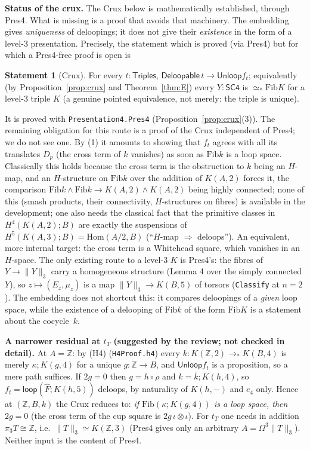 \documentclass[11pt]{amsart}
\theoremstyle{definition}
\newtheorem{statement}[theorem]{Statement}
\theoremstyle{remark}
\newcommand{\Om}{\Omega}
\newcommand{\code}[1]{\texttt{#1}}
\newcommand{\Fib}{\mathrm{Fib}}
\newcommand{\tr}[1]{\|#1\|}
\newcommand{\SCf}{\mathsf{SC4}}
\newcommand{\Tri}{\mathsf{Triples}}
\newcommand{\Del}{\mathsf{Deloopable}}
\newcommand{\Unloop}{\mathsf{Unloop}}
\newcommand{\pteq}{\simeq_*}
\newcommand{\lp}{\mathsf{loop}}
\newcommand{\Z}{\mathbb{Z}}
\begin{document}
\noindent\textbf{Status of the crux.} The Crux below is mathematically
established, through Pres4. What is missing is a proof that avoids that
machinery. The embedding gives \emph{uniqueness} of
deloopings; it does not give their \emph{existence} in the form of a level-$3$
presentation. Precisely, the statement which is proved (via Pres4) but for which a
Pres4-free proof is open is
\begin{statement}[Crux]
For every $t:\Tri$, $\Del\,t\to\Unloop f_t$; equivalently (by
Proposition~\ref{prop:crux} and Theorem~\ref{thm:E}) every $Y:\SCf$ is
$\pteq\Fib K$ for a level-$3$ triple $K$ (a genuine pointed equivalence, not
merely: the triple is unique).
\end{statement}
\noindent It is proved with \code{Presentation4.Pres4} (Proposition~\ref{prop:crux}(3)).
The remaining obligation for this route is a proof of the Crux independent of
Pres4; we do not see one. By (1) it amounts to
showing that $f_t$ agrees with all its translates $D_p$ (the cross term of $k$
vanishes) as soon as $\Fib k$ is a loop space. Classically this holds because
the cross term is the obstruction to $k$ being an $H$-map, and an $H$-structure
on $\Fib k$ over the addition of $K(A,2)$ forces it, the comparison
$\Fib k\wedge\Fib k\to K(A,2)\wedge K(A,2)$ being highly connected; none of this
(smash products, their connectivity, $H$-structures on fibres) is available in
the development; one also needs the classical fact that the primitive
classes in $H^4(K(A,2);B)$ are exactly the suspensions of
$H^5(K(A,3);B)=\mathrm{Hom}(A/2,B)$ (``$H$-map $\Rightarrow$ deloops''). An
equivalent, more internal target: the cross term is a Whitehead square, which
vanishes in an $H$-space. The only existing route to a level-$3$ $K$ is Pres4's: the
fibres of $Y\to\tr{Y}_3$ carry a homogeneous structure (Lemma 4 over the simply
connected $Y$), so $z\mapsto(E_z,\mu_z)$ is a map $\tr Y_3\to K(B,5)$ of
torsors (\code{Classify} at $n=2$). The embedding does not shortcut this: it
compares deloopings of a \emph{given} loop space, while the existence of a
delooping of $\Fib k$ of the form $\Fib K$ is a statement about the cocycle~$k$.

\noindent\textbf{A narrower residual at $t_T$ (suggested by the review; not
checked in detail).} At $A=\Z$: by (H4) (\code{H4Proof.h4}) every
$k:K(\Z,2)\to_*K(B,4)$ is merely $\kappa;K(g,4)$ for a unique $g:\Z\to B$, and
$\Unloop f_t$ is a proposition, so a mere path suffices. If $2g=0$ then
$g=h\circ\rho$ and $k=\bar k;K(h,4)$, so $f_t=\lp(\hat F;K(h,5))$ deloops, by
naturality of $K(h,-)$ and $e_4$ only. Hence at $(\Z,B,k)$ the Crux reduces
to: \emph{if $\Fib(\kappa;K(g,4))$ is a loop space, then $2g=0$} (the cross term
of the cup square is $2g\,\iota\otimes\iota$). For $t_T$ one needs in
addition $\pi_3T\cong\Z$, i.e.\ $\tr T_3\simeq K(\Z,3)$ (Pres4 gives only an
arbitrary $A=\Om^3\tr T_3$). Neither input is the content of Pres4.
\end{document}

